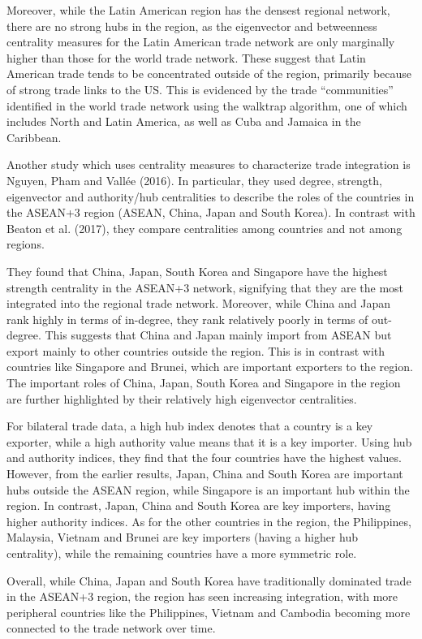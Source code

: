 \documentclass[12pt,letterpaper]{report}
\begin{document}
	Moreover, while the Latin American region has the densest regional network, there are no strong hubs in the region, as the eigenvector and betweenness centrality measures for the Latin American trade network are only marginally higher than those for the world trade network. These suggest that Latin American trade tends to be concentrated outside of the region, primarily because of strong trade links to the US. This is evidenced by the trade ``communities'' identified in the world trade network using the walktrap algorithm, one of which includes North and Latin America, as well as Cuba and Jamaica in the Caribbean.
	
	Another study which uses centrality measures to characterize trade integration is Nguyen, Pham and Vallée (2016). In particular, they used degree, strength, eigenvector and authority/hub centralities to describe the roles of the countries in the ASEAN+3 region (ASEAN, China, Japan and South Korea). In contrast with Beaton et al. (2017), they compare centralities among countries and not among regions.
	
	They found that China, Japan, South Korea and Singapore have the highest strength centrality in the ASEAN+3 network, signifying that they are the most integrated into the regional trade network. Moreover, while China and Japan rank highly in terms of in-degree, they rank relatively poorly in terms of out-degree. This suggests that China and Japan mainly import from ASEAN but export mainly to other countries outside the region. This is in contrast with countries like Singapore and Brunei, which are important exporters to the region. The important roles of China, Japan, South Korea and Singapore in the region are further highlighted by their relatively high eigenvector centralities. 
	
	For bilateral trade data, a high hub index denotes that a country is a key exporter, while a high authority value means that it is a key importer. Using hub and authority indices, they find that the four countries have the highest values. However, from the earlier results, Japan, China and South Korea are important hubs outside the ASEAN region, while Singapore is an important hub within the region. In contrast, Japan, China and South Korea are key importers, having higher authority indices. As for the other countries in the region, the Philippines, Malaysia, Vietnam and Brunei are key importers (having a higher hub centrality), while the remaining countries have a more symmetric role.
	
	Overall, while China, Japan and South Korea have traditionally dominated trade in the ASEAN+3 region, the region has seen increasing integration, with more peripheral countries like the Philippines, Vietnam and Cambodia becoming more connected to the trade network over time. 
\end{document}
